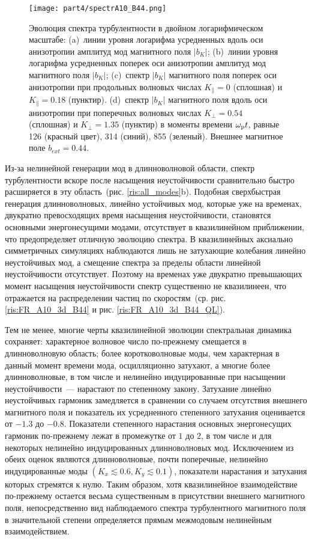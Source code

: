 \begin{figure}[h]

\texttt{[image: part4/spectrA10\_B44.png]}
\caption{Эволюция спектра турбулентности в двойном логарифмическом масштабе: (a)~линии уровня логарифма усредненных вдоль оси анизотропии амплитуд мод магнитного поля $|b_K|$; 
(b)~линии уровня логарифма усредненных поперек оси анизотропии амплитуд мод магнитного поля $|b_K|$; 
(c)~спектр $|b_K|$ магнитного поля поперек оси анизотропии при продольных волновых числах $K_\|=0$ (сплошная) и $K_\|=0.18$ (пунктир). 
(d)~спектр $|b_K|$ магнитного поля вдоль оси анизотропии при поперечных волновых числах $K_\perp=0.54$ (сплошная) и $K_\perp=1.35$ (пунктир) в моменты времени $\omega_\mathrm{p} t$, равные 126 (красный цвет), 314 (синий), 855 (зеленый). Внешнее магнитное поле $b_{ext}=0.44$.
}
\label{ris:spectrA10_B44}
\end{figure}



Из-за нелинейной генерации мод в длинноволновой области, спектр турбулентности вскоре после насыщения неустойчивости сравнительно быстро расширяется в эту область~(рис. \ref{ris:all_modes}b). Подобная сверхбыстрая генерация длинноволновых, линейно устойчивых мод, которые уже на временах, двукратно превосходящих время насыщения неустойчивости, становятся основными энергонесущими модами, отсутствует в квазилинейном приближении, что предопределяет отличную эволюцию спектра. В квазилинейных аксиально симметричных симуляциях наблюдаются лишь не затухающие колебания линейно неустойчивых мод, а смещение спектра за пределы области линейной неустойчивости отсутствует. Поэтому на временах уже двукратно превышающих момент насыщения неустойчивости спектр существенно не квазилинеен, что отражается на распределении частиц по скоростям~(ср. рис. \ref{ris:FR_A10_3d_B44} и рис. \ref{ris:FR_A10_3d_B44_QL}).



Тем не менее, многие черты квазилинейной эволюции спектральная динамика сохраняет: характерное волновое число по-прежнему смещается в длинноволновую область;  более коротковолновые моды, чем характерная в данный момент времени мода, осцилляционно затухают, а многие более длинноволновые, в том числе и нелинейно индуцированные при насыщении неустойчивости~--- нарастают по степенному закону. Затухание линейно неустойчивых гармоник замедляется в сравнении со случаем отсутствия внешнего магнитного поля и показатель их усредненного степенного затухания оценивается от $-1.3$ до $-0.8$. Показатели степенного нарастания основных энергонесущих гармоник по-прежнему лежат в промежутке от $1$ до $2$, в том числе и для некоторых нелинейно индуцированных длинноволновых мод. Исключением из обеих оценок являются длинноволновые, почти поперечные, нелинейно индуцированные моды $\left(K_x\lesssim0.6,K_y\lesssim0.1\right)$, показатели нарастания и затухания которых стремятся к нулю. Таким образом, хотя квазилинейное взаимодействие по-прежнему остается весьма существенным в присутствии внешнего магнитного поля, непосредственно вид наблюдаемого спектра турбулентного магнитного поля в значительной степени определяется прямым межмодовым нелинейным взаимодействием.


